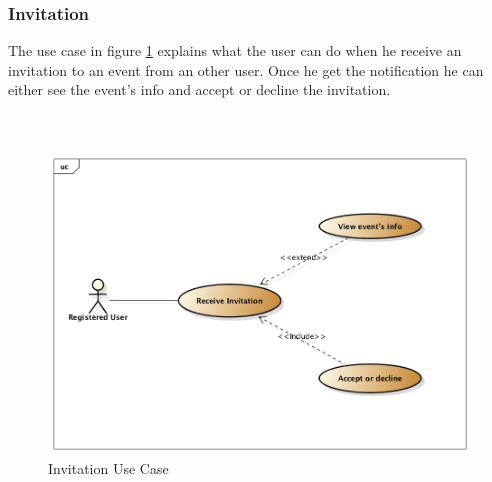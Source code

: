 \subsubsection{Invitation}
The use case in figure \ref{fig:invitusecase} explains what the user can do when he receive an invitation to an event from an other user. Once he get the notification he can either see the event's info and accept or decline the invitation.\\\\\\
 \begin{center}
 \begin{figure}[H]
    \includegraphics[width=1\textwidth]{../UMLDiagram/use_case/Invitation/Invitation.png}
    \caption{Invitation Use Case}
     \label{fig:invitusecase}
     \end{figure}
   \end{center}  

